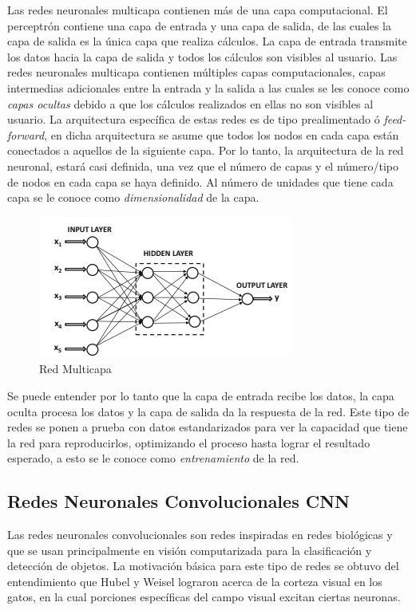 Las redes neuronales multicapa contienen más de una capa computacional. El perceptrón contiene una capa de entrada y una capa de salida, de las cuales la capa de salida es la única capa que realiza cálculos. La capa de entrada transmite los datos hacia la capa de salida y todos los cálculos son visibles al usuario. Las redes neuronales multicapa contienen múltiples capas computacionales, capas intermedias adicionales entre la entrada y la salida a las cuales se les conoce como \textit{capas ocultas} debido a que los cálculos realizados en ellas no son visibles al usuario. La arquitectura específica de estas redes es de tipo prealimentado ó \textit{feed-forward}, en dicha arquitectura se asume que todos los nodos en cada capa están conectados a aquellos de la siguiente capa. Por lo tanto, la arquitectura de la red neuronal, estará casi definida, una vez que el número de capas y el número/tipo de nodos en cada capa se haya definido. Al número de unidades que tiene cada capa se le conoce como \textit{dimensionalidad} de la capa.

\begin{figure}[h!] %
		\centering	
		\includegraphics[scale=1]{redmulticapa.png}
		\caption{Red Multicapa}
\end{figure}

Se puede entender por lo tanto que la capa de entrada recibe los datos, la capa oculta procesa los datos y la capa de salida da la respuesta de la red. Este tipo de redes se ponen a prueba con datos estandarizados para ver la capacidad que tiene la red para reproducirlos, optimizando el proceso hasta lograr el resultado esperado, a esto se le conoce como \textit{entrenamiento} de la red.

\subsection{Redes Neuronales Convolucionales CNN}

Las redes neuronales convolucionales son redes inspiradas en redes biológicas y que se usan principalmente en visión computarizada para la clasificación y detección de objetos. La motivación básica para este tipo de redes se obtuvo del entendimiento que Hubel y Weisel lograron acerca de la corteza visual en los gatos, en la cual porciones específicas del campo visual excitan ciertas neuronas. 

